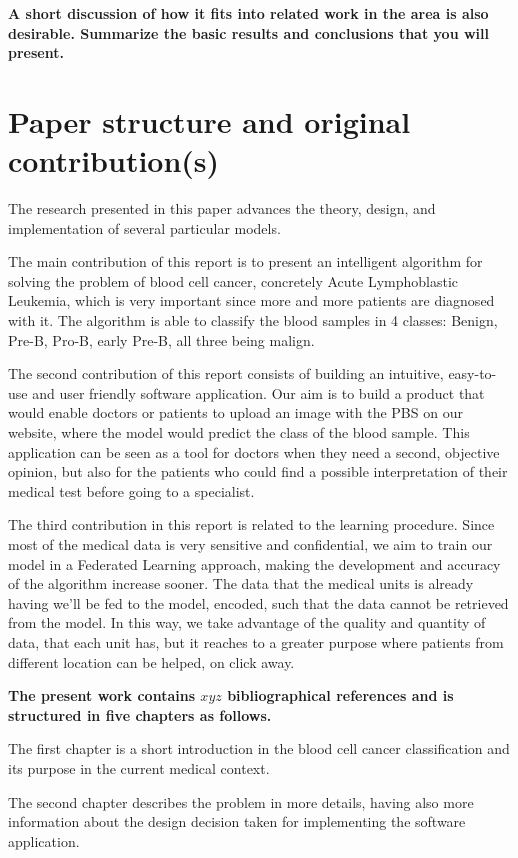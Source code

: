 \documentclass[runningheads,a4paper,11pt]{report}
\begin{document}
\textbf {A short discussion of how it fits into related work in the area is also desirable. Summarize the basic results and conclusions that you will present. }


\section{Paper structure and original contribution(s)}
\label{section:structure}

The research presented in this paper advances the theory, design, and implementation of several particular models. 

The main contribution of this report is to present an intelligent algorithm for solving the problem of blood cell cancer, concretely Acute Lymphoblastic Leukemia, which is very important since more and more patients are diagnosed with it. The algorithm is able to classify the blood samples in 4 classes: Benign, Pre-B, Pro-B, early Pre-B, all three being malign.

The second contribution of this report consists of building an intuitive, easy-to-use and user friendly software application. Our aim is to build a product that would enable doctors or patients to upload an image with the PBS on our website, where the model would predict the class of the blood sample. This application can be seen as a tool for doctors when they need a second, objective opinion, but also for the patients who could find a possible interpretation of their medical test before going to a specialist.

The third contribution in this report is related to the learning procedure. Since most of the medical data is very sensitive and confidential, we aim to train our model in a Federated Learning approach, making the development and accuracy of the algorithm increase sooner. The data that the medical units is already having we'll be fed to the model, encoded, such that the data cannot be retrieved from the model. In this way, we take advantage of the quality and quantity of data, that each unit has, but it reaches to a greater purpose where patients from different location can be helped, on click away.

\textbf{The present work contains $xyz$ bibliographical references and is structured in five chapters as follows.}

The first chapter is a short introduction in the blood cell cancer classification and its purpose in the current medical context.

The second chapter describes the problem in more details, having also more information about the design decision taken for implementing the software application.
\end{document}
